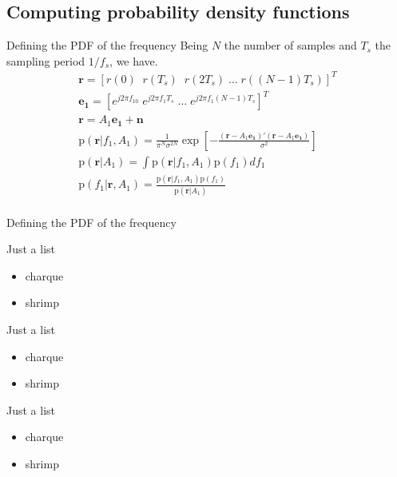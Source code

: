 ﻿\documentclass[mathserif]{beamer}
\begin{document}
	
	
	\subsection{Computing probability density functions}
	\begin{frame}{Defining the PDF of the frequency}
		Being $N$ the number of samples and $T_s$ the sampling period $1/f_s$, we have.
		\begin{gather*}
			\mathbf{r} =  [r(0) \; \; r(T_s) \; \; r(2T_s) \; \dots \; r((N-1)T_s)]^T \\
			\mathbf{e_1} =  [e^{j2\pi f_10} \; e^{j2\pi f_1T_s} \; \dots \; e^{j2\pi f_1(N-1)T_s}]^T \\		
			\mathbf{r} = A_1\mathbf{e_1} + \mathbf{n} \\
			\mathrm{p}(\mathbf{r}|f_1,A_1) = \frac{1}{\pi^N\sigma^{2N}}\exp\left[-\frac{(\mathbf{r}-A_1\mathbf{e_1})'
				(\mathbf{r}-A_1\mathbf{e_1})}{\sigma^2}\right] \\
			\mathrm{p}(\mathbf{r}|A_1) = \int \mathrm{p}(\mathbf{r}|f_1,A_1)\mathrm{p}(f_1)df_1\\
			\mathrm{p}(f_1|\mathbf{r},A_1) = \frac{\mathrm{p}(\mathbf{r}|f_1,A_1)\mathrm{p}(f_1)}{\mathrm{p}(\mathbf{r}|A_1)} \\
		\end{gather*}
	\end{frame}
	\begin{frame}{Defining the PDF of the frequency}
		\begin{greenbox}{Just a list}
			\begin{itemize}
				\item charque
				\item shrimp
			\end{itemize}
		\end{greenbox}
		\begin{orangebox}{Just a list}
			\begin{itemize}
				\item charque
				\item shrimp
			\end{itemize}
		\end{orangebox}
		\begin{bluebox}{Just a list}
			\begin{itemize}
				\item charque
				\item shrimp
			\end{itemize}
		\end{bluebox}
	\end{frame}
	
\end{document}
